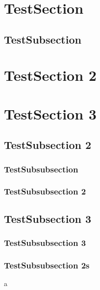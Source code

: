 \documentclass[8pt, a4paper, twoside]{extarticle}
\begin{document}
        \section{TestSection}
        \subsection*{TestSubsection}
        \section*{TestSection 2}
        \newpage
        \section{TestSection 3}
        \subsection{TestSubsection 2}
        \subsubsection{TestSubsubsection}
        \subsubsection{TestSubsubsection 2}
        \subsection{TestSubsection 3}
        \subsubsection{TestSubsubsection 3}
        \newpage
        \subsubsection*{TestSubsubsection 2s}
        a
\end{document}

